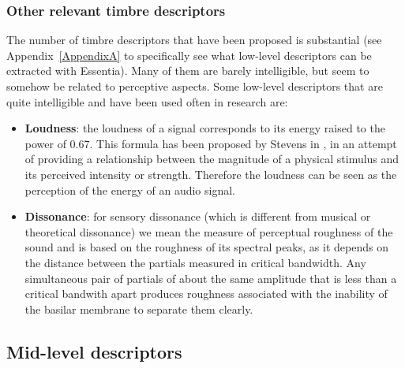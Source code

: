 \subsubsection*{Other relevant timbre descriptors}
The number of timbre descriptors that have been proposed is substantial (see Appendix~\ref{AppendixA} to specifically see what low-level descriptors can be extracted with Essentia). Many of them are barely intelligible, but seem to somehow be related to perceptive aspects. Some low-level descriptors that are quite intelligible and have been used often in research are:
\begin{itemize}
\item \textbf{Loudness}: the loudness of a signal corresponds to its energy raised to the power of 0.67. This formula has been proposed by Stevens in \cite{stevens57}, in an attempt of providing a relationship between the magnitude of a physical stimulus and its perceived intensity or strength. Therefore the loudness can be seen as the perception of the energy of an audio signal.
\item \textbf{Dissonance}: for sensory dissonance (which is different from musical or theoretical dissonance) we mean the measure of perceptual roughness of the sound and is based on the roughness of its spectral peaks, as it depends on the distance between the partials measured in critical bandwidth. Any simultaneous pair of partials of about the same amplitude that is less than a critical bandwith apart produces roughness associated with the inability of the basilar membrane to separate them clearly. 
\end{itemize}

\subsection{Mid-level descriptors}
